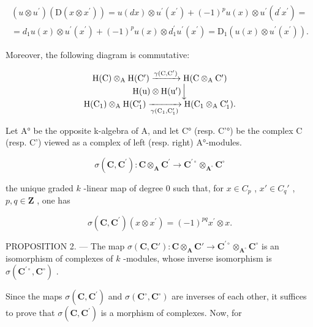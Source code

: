 \[
\begin{array}{c} (u \otimes u ^ {\prime}) (\mathrm{D} (x \otimes x ^ {\prime})) = u (d x) \otimes u ^ {\prime} (x ^ {\prime}) + (- 1) ^ {p} u (x) \otimes u ^ {\prime} (d ^ {\prime} x ^ {\prime}) = \\ = d _ {1} u (x) \otimes u ^ {\prime} (x ^ {\prime}) + (- 1) ^ {p} u (x) \otimes d _ {1} ^ {\prime} u ^ {\prime} (x ^ {\prime}) = \mathrm{D} _ {1} (u (x) \otimes u ^ {\prime} (x ^ {\prime}))  . \end{array}
\]

Moreover, the following diagram is commutative:

\[
\begin{array}{c} \mathrm{H(C)} \otimes_ {\mathrm{A}} \mathrm {H(C^ {\prime})} \xrightarrow {\gamma (\mathrm{C,C} ^ {\prime})} \mathrm{H(C} \otimes_ {\mathrm{A}} \mathrm {C^ {\prime}}) \\ \mathrm{H(u)} \otimes \mathrm {H(u^{\prime})} \Big \downarrow \\ \mathrm {H(C_ {1})} \otimes_ {\mathrm{A}} \mathrm {H(C_ {1} ^ {\prime})} \xrightarrow [ \gamma (\mathrm {C_ {1}} , \mathrm {C_ {1} ^ {\prime}}) ]{} \mathrm {H(C_ {1}} \otimes_ {\mathrm{A}} \mathrm {C_ {1} ^ {\prime}}). \end{array}
\]

Let A° be the opposite k-algebra of A, and let C° (resp. C'°) be the complex C (resp. C') viewed as a complex of left (resp. right) A°-modules.

\[
\sigma (\mathbf {C}, \mathbf {C} ^ {\prime}): \mathbf {C} \otimes_ {\mathbf {A}} \mathbf {C} ^ {\prime} \rightarrow \mathbf {C} ^ {\prime \circ} \otimes_ {\mathbf {A} ^ {\circ}} \mathbf {C} ^ {\circ}
\]

the unique graded \(k\) -linear map of degree 0 such that, for \(x \in C_p\) , \(x' \in C_q'\) , \(p, q \in \mathbf{Z}\) , one has

\[
\sigma (\mathbf {C}, \mathbf {C} ^ {\prime}) (x \otimes x ^ {\prime}) = (- 1) ^ {p q} x ^ {\prime} \otimes x.
\]

PROPOSITION 2. — The map \(\sigma(\mathbf{C},\mathbf{C}'):\mathbf{C}\otimes_{\mathbf{A}}\mathbf{C}'\to\mathbf{C}^{\prime\circ}\otimes_{\mathbf{A}^{\circ}}\mathbf{C}^{\circ}\) is an isomorphism of complexes of \(k\) -modules, whose inverse isomorphism is \(\sigma(\mathbf{C}^{\prime\circ},\mathbf{C}^{\circ})\) .

Since the maps \(\sigma(\mathbf{C},\mathbf{C}^{\prime})\) and \(\sigma(\mathbf{C}^{\circ},\mathbf{C}^{\circ})\) are inverses of each other, it suffices to prove that \(\sigma(\mathbf{C},\mathbf{C}^{\prime})\) is a morphism of complexes. Now, for

